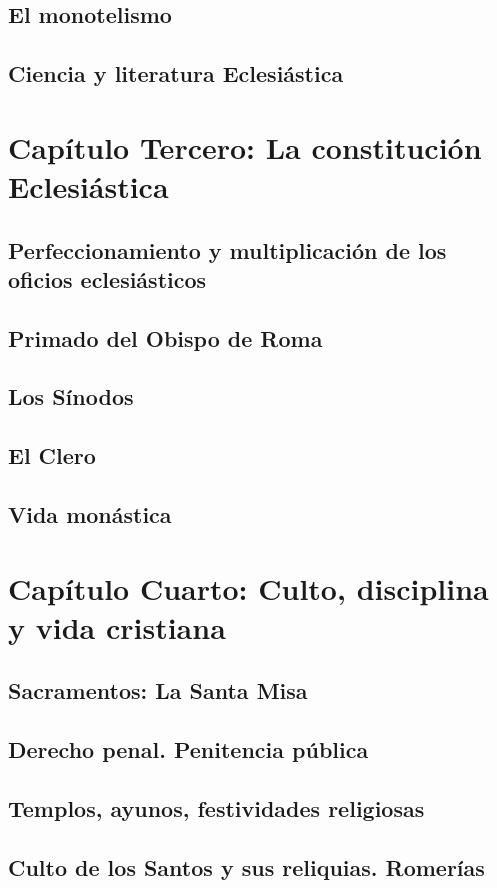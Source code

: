 \raggedbottom{} \documentclass[12pt, a4paper]{book}
\begin{document}
\section{El monotelismo}
\section{Ciencia y literatura Eclesiástica}
\chapter{Capítulo Tercero: La constitución Eclesiástica}
\section{Perfeccionamiento y multiplicación de los oficios eclesiásticos}
\section{Primado del Obispo de Roma}
\section{Los Sínodos}
\section{El Clero}
\section{Vida monástica}
\chapter{Capítulo Cuarto: Culto, disciplina y vida cristiana}
\section{Sacramentos: La Santa Misa}
\section{Derecho penal. Penitencia pública}
\section{Templos, ayunos, festividades religiosas}
\section{Culto de los Santos y sus reliquias. Romerías}
\end{document}
